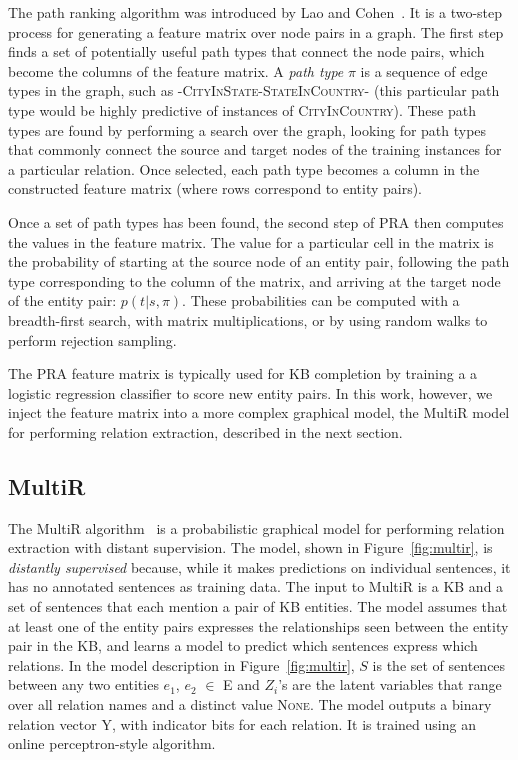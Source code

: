 \documentclass[11pt,a4paper]{article}
\newcommand{\figref}[1]{Figure~\ref{fig:#1}}
\newcommand{\relation}[1]{\textsc{#1}}
\newcommand{\pathtype}{\ensuremath{\pi}}
\begin{document}
The path ranking algorithm was introduced by Lao and
Cohen~.  It is a two-step process for generating a
feature matrix over node pairs in a graph.  The first step finds a set of
potentially useful path types that connect the node pairs, which become the
columns of the feature matrix.  A \emph{path type} \pathtype{} is a sequence of
edge types in the graph, such as
-\relation{CityInState}-\relation{StateInCountry}- (this particular path type
would be highly predictive of instances of \relation{CityInCountry}).  These
path types are found by performing a search over the graph, looking for path
types that commonly connect the source and target nodes of the training
instances for a particular relation.  Once selected, each path type becomes a
column in the constructed feature matrix (where rows correspond to entity
pairs).

Once a set of path types has been found, the second step of PRA then computes
the values in the feature matrix.  The value for a particular cell in the
matrix is the probability of starting at the source node of an entity pair,
following the path type corresponding to the column of the matrix, and arriving
at the target node of the entity pair: $p(t|s,\pathtype)$.  These probabilities
can be computed with a breadth-first search, with matrix multiplications, or by
using random walks to perform rejection sampling.

The PRA feature matrix is typically used for KB completion by training a a
logistic regression classifier to score new entity pairs.  In this work,
however, we inject the feature matrix into a more complex graphical model, the
MultiR model for performing relation extraction, described in the next section.

\subsection{MultiR}

The MultiR algorithm~\cite{hoffmann-2011-distant-supervision} is a
probabilistic graphical model for performing relation extraction with distant
supervision.  The model, shown in \figref{multir}, is \emph{distantly
supervised} because, while it makes predictions on individual sentences, it has
no annotated sentences as training data.  The input to MultiR is a KB and a set
of sentences that each mention a pair of KB entities.  The model assumes that
at least one of the entity pairs expresses the relationships seen between the
entity pair in the KB, and learns a model to predict which sentences express
which relations.  In the model description in \figref{multir}, $S$ is the set
of sentences between any two entities $e_1$, $e_2$ $\in$ E and $Z_i$'s are the
latent variables that range over all relation names and a distinct value
\relation{None}.  The model outputs a binary relation vector Y, with indicator
bits for each relation.  It is trained using an online perceptron-style
algorithm.
\end{document}
